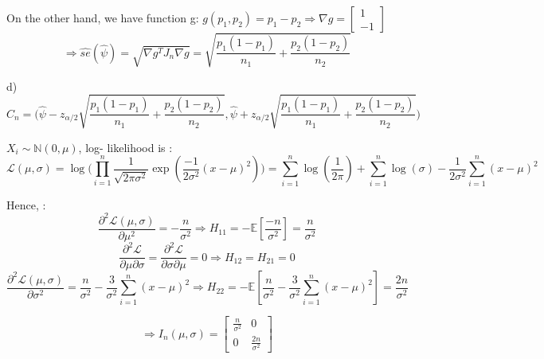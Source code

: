 \documentclass[10pt]{article}
\newenvironment{problem}[2][Problem]{\begin{trivlist}
\item[\hskip \labelsep {\bfseries #1}\hskip \labelsep {\bfseries #2.}]}{\end{trivlist}}
\begin{document}
\begin{problem}{7}
On the other hand, we have function g: $g(p_1, p_2)= p_1- p_2 \Rightarrow \nabla g= \begin{bmatrix}
1 \\
-1 
\end{bmatrix}$\\
\[\Rightarrow \hat{se}(\hat{\psi})=\sqrt{\nabla g^T J_n \nabla g}= \sqrt{\frac{p_1(1-p_1)}{n_1}+ \frac{p_2(1-p_2)}{n_2}}\]

d)\\
\[C_n =\big( \hat{\psi} - z_{\alpha /2}\sqrt{\frac{p_1(1-p_1)}{n_1}+ \frac{p_2(1-p_2)}{n_2}}, \hat{\psi} + z_{\alpha /2}\sqrt{\frac{p_1(1-p_1)}{n_1}+ \frac{p_2(1-p_2)}{n_2}} \big)\]


\end{problem}



\begin{problem}{8}

$X_i \sim \mathbb{N}(0, \mu) $, log- likelihood is :
\[\mathcal{L}(\mu, \sigma)=\log\big(\prod_{i=1}^{n}\frac{1}{\sqrt{2\pi\sigma ^2}} \exp (\frac{-1}{2\sigma ^2}(x-\mu)^2) \big)=\sum_{i=1}^{n}\log(\frac{1}{2\pi}) + \sum_{i=1}^{n}\log(\sigma)- \frac{1}{2\sigma ^2} \sum_{i=1}^{n}(x-\mu)^2\] 

Hence, :
\[\frac{\partial ^2 \mathcal{L}(\mu, \sigma)}{\partial \mu ^2}= -\frac{n}{\sigma ^2} \Rightarrow H_{11}= -\mathbb{E}[\frac{-n}{\sigma ^2}]= \frac{n}{\sigma ^2}\]
\[\frac{\partial ^2 \mathcal{L}}{\partial \mu \partial \sigma}= \frac{\partial ^2 \mathcal{L}}{\partial \sigma\partial \mu }= 0 \Rightarrow H_{12}=H_{21}=0\]
\[\frac{\partial ^2 \mathcal{L}(\mu, \sigma)}{\partial \sigma ^2}= \frac{n}{\sigma ^2} -\frac{3}{\sigma ^2} \sum_{i=1}^{n}(x-\mu)^2 \Rightarrow H_{22}= -\mathbb{E}[\frac{n}{\sigma ^2} -\frac{3}{\sigma ^2} \sum_{i=1}^{n}(x-\mu)^2]= \frac{2n}{\sigma ^2}\]

\[\Rightarrow I_n(\mu, \sigma)= \begin{bmatrix}
\frac{n}{\sigma ^2} & 0 \\
0 & \frac{2n}{\sigma ^2} 
\end{bmatrix}\]


\end{problem}
\end{document}
